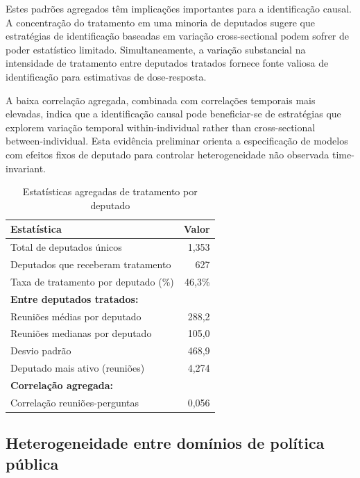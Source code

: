 
Estes padrões agregados têm implicações importantes para a identificação causal. A concentração do tratamento em uma minoria de deputados sugere que estratégias de identificação baseadas em variação cross-sectional podem sofrer de poder estatístico limitado. Simultaneamente, a variação substancial na intensidade de tratamento entre deputados tratados fornece fonte valiosa de identificação para estimativas de dose-resposta.

A baixa correlação agregada, combinada com correlações temporais mais elevadas, indica que a identificação causal pode beneficiar-se de estratégias que explorem variação temporal within-individual rather than cross-sectional between-individual. Esta evidência preliminar orienta a especificação de modelos com efeitos fixos de deputado para controlar heterogeneidade não observada time-invariant.

\begin{table}[htbp]
\centering
\caption{Estatísticas agregadas de tratamento por deputado}
\label{tab:mep_treatment_stats}
\begin{tabular}{lr}
\toprule
\textbf{Estatística} & \textbf{Valor} \\
\midrule
Total de deputados únicos & 1{,}353 \\
Deputados que receberam tratamento & 627 \\
Taxa de tratamento por deputado (\%) & 46{,}3\% \\
\midrule
\textbf{Entre deputados tratados:} & \\
Reuniões médias por deputado & 288{,}2 \\
Reuniões medianas por deputado & 105{,}0 \\
Desvio padrão & 468{,}9 \\
Deputado mais ativo (reuniões) & 4{,}274 \\
\midrule
\textbf{Correlação agregada:} & \\
Correlação reuniões-perguntas & 0{,}056 \\
\bottomrule
\end{tabular}
\end{table}

\subsection{Heterogeneidade entre domínios de política pública}

